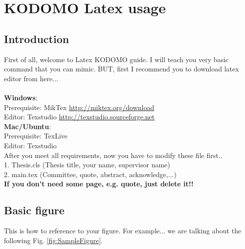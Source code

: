 
\chapter{KODOMO Latex usage} %

\label{Chapter1}




\section{Introduction}
\label{intro}
First of all, welcome to Latex KODOMO guide. I will teach you very basic command that you can mimic. BUT, first I recommend you to download latex editor from here...\\ \\
\textbf{Windows}:\\
Prerequisite: MikTex \href{http://miktex.org/download}{http://miktex.org/download}\\
Editor: Texstudio \href{http://texstudio.sourceforge.net/}{http://texstudio.sourceforge.net}\\
\textbf{Mac/Ubuntu}:\\
Prerequisite: TexLive\\
Editor: Texstudio\\

After you meet all requirements, now you have to modify these file first..\\
1. Thesis.cls (Thesis title, your name, supervisor name)\\
2. main.tex (Committee, quote, abstract, acknowledge,...)\\

\textbf{If you don't need some page, e.g. quote, just delete it!!}

\section{Basic figure}
\label{basic_fig}
This is how to reference to your figure. For example... we are talking about the following Fig. \ref{fig:SampleFigure}.

